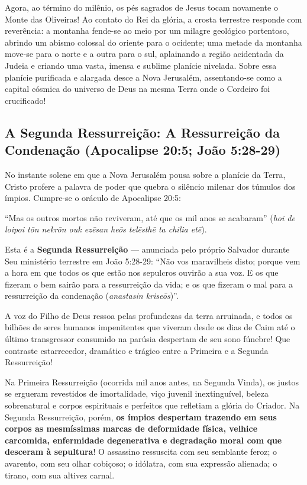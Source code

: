 Agora, ao término do milênio, os pés sagrados de Jesus tocam novamente o Monte das Oliveiras!
Ao contato do Rei da glória, a crosta terrestre responde com reverência: a montanha fende-se ao meio por um milagre geológico portentoso, abrindo um abismo colossal do oriente para o ocidente; uma metade da montanha move-se para o norte e a outra para o sul, aplainando a região acidentada da Judeia e criando uma vasta, imensa e sublime planície nivelada.
Sobre essa planície purificada e alargada desce a Nova Jerusalém, assentando-se como a capital cósmica do universo de Deus na mesma Terra onde o Cordeiro foi crucificado!



\subsection{A Segunda Ressurreição: A Ressurreição da Condenação (Apocalipse 20:5; João 5:28-29)}


No instante solene em que a Nova Jerusalém pousa sobre a planície da Terra, Cristo profere a palavra de poder que quebra o silêncio milenar dos túmulos dos ímpios. Cumpre-se o oráculo de Apocalipse 20:5:

``Mas os outros mortos não reviveram, até que os mil anos se acabaram'' (\textit{hoi de loipoi tōn nekrōn ouk ezēsan heōs telēsthē ta chilia etē}).

Esta é a \textbf{Segunda Ressurreição} — anunciada pelo próprio Salvador durante Seu ministério terrestre em João 5:28-29:
``Não vos maravilheis disto; porque vem a hora em que todos os que estão nos sepulcros ouvirão a sua voz. E os que fizeram o bem sairão para a ressurreição da vida; e os que fizeram o mal para a ressurreição da condenação (\textit{anastasin kriseōs})''.

A voz do Filho de Deus ressoa pelas profundezas da terra arruinada, e todos os bilhões de seres humanos impenitentes que viveram desde os dias de Caim até o último transgressor consumido na parúsia despertam de seu sono fúnebre!
Que contraste estarrecedor, dramático e trágico entre a Primeira e a Segunda Ressurreição!

Na Primeira Ressurreição (ocorrida mil anos antes, na Segunda Vinda), os justos se ergueram revestidos de imortalidade, viço juvenil inextinguível, beleza sobrenatural e corpos espirituais e perfeitos que refletiam a glória do Criador.
Na Segunda Ressurreição, porém, \textbf{os ímpios despertam trazendo em seus corpos as mesmíssimas marcas de deformidade física, velhice carcomida, enfermidade degenerativa e degradação moral com que desceram à sepultura}! O assassino ressuscita com seu semblante feroz; o avarento, com seu olhar cobiçoso; o idólatra, com sua expressão alienada; o tirano, com sua altivez carnal.

